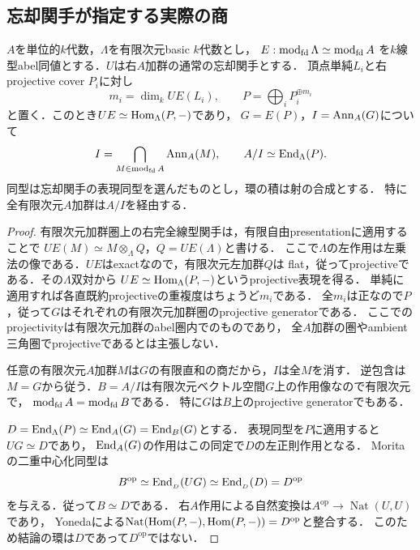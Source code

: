 \subsection{忘却関手が指定する実際の商}
\begin{lemma}[有限な加群圏の普遍商]\label{lem:finite-fibre-quotient}
$A$を単位的$k$代数，$\Lambda$を有限次元basic $k$代数とし，
$E:\operatorname{mod}_{\rm fd}\Lambda\simeq\operatorname{mod}_{\rm fd}A$
を$k$線型abel同値とする．$U$は右$A$加群の通常の忘却関手とする．
頂点単純$L_i$と右projective cover $P_i$に対し
\[
 m_i=\dim_k UE(L_i),\qquad P=\bigoplus_i P_i^{\oplus m_i}
\]
と置く．このとき$UE\simeq\operatorname{Hom}_\Lambda(P,-)$であり，
$G=E(P)$，$I=\operatorname{Ann}_A(G)$について
\[
 I=\bigcap_{M\in\operatorname{mod}_{\rm fd}A}\operatorname{Ann}_A(M),\qquad
 A/I\simeq\operatorname{End}_\Lambda(P).
\]
同型は忘却関手の表現同型を選んだものとし，環の積は射の合成とする．
特に全有限次元$A$加群は$A/I$を経由する．
\end{lemma}
\begin{proof}
有限次元加群圏上の右完全線型関手は，有限自由presentationに適用することで
$UE(M)\simeq M\otimes_\Lambda Q$，$Q=UE(\Lambda)$と書ける．
ここで$\Lambda$の左作用は左乗法の像である．$UE$はexactなので，有限次元左加群$Q$は
flat，従ってprojectiveである．その$\Lambda$双対から
$UE\simeq\operatorname{Hom}_\Lambda(P,-)$というprojective表現を得る．
単純に適用すれば各直既約projectiveの重複度はちょうど$m_i$である．
全$m_i$は正なので$P$，従って$G$はそれぞれの有限次元加群圏のprojective generatorである．
ここでのprojectivityは有限次元加群のabel圏内でのものであり，
全$A$加群の圏やambient三角圏でprojectiveであるとは主張しない．

任意の有限次元$A$加群$M$は$G$の有限直和の商だから，$I$は全$M$を消す．
逆包含は$M=G$から従う．$B=A/I$は有限次元ベクトル空間$G$上の作用像なので有限次元で，
$\operatorname{mod}_{\rm fd}A=\operatorname{mod}_{\rm fd}B$である．
特に$G$は$B$上のprojective generatorでもある．

$D=\operatorname{End}_\Lambda(P)\simeq\operatorname{End}_A(G)=\operatorname{End}_B(G)$とする．
表現同型を$P$に適用すると$UG\simeq D$であり，
$\operatorname{End}_A(G)$の作用はこの同定で$D$の左正則作用となる．
Moritaの二重中心化同型は
\[
 B^{\mathrm{op}}\simeq\operatorname{End}_{{}_D}(UG)
       \simeq\operatorname{End}_{{}_D}(D)=D^{\mathrm{op}}
\]
を与える．従って$B\simeq D$である．
右$A$作用による自然変換は$A^{\mathrm{op}}\to\operatorname{Nat}(U,U)$であり，
Yonedaによる$\operatorname{Nat}(\operatorname{Hom}(P,-),\operatorname{Hom}(P,-))=D^{\mathrm{op}}$と整合する．
このため結論の環は$D$であって$D^{\mathrm{op}}$ではない．
\end{proof}

